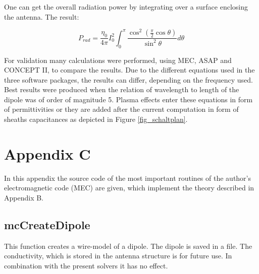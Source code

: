 \documentclass[a4paper,11pt]{thesis}
\begin{document}
One can get the overall radiation power by integrating over a surface enclosing the antenna. The result:

\begin{equation}\label{total_power_hwd}
P_{rad} = \frac{\eta_0}{4 \pi} I_0^2 \int_0^{\pi} \frac{\cos^2 (\frac{\pi}{2} \cos \theta)}{\sin^2 \theta} d \theta
\end{equation}

For validation many calculations were performed, using MEC, ASAP and CONCEPT II, to compare the results. Due to the different equations used in the three software packages, the results can differ, depending on the frequency used. Best results were produced when the relation of wavelength to length of the dipole was of order of magnitude 5. Plasma effects enter these equations in form of permittivities or they are added after the current computation in form of sheaths capacitances as depicted in Figure \ref{fig_schaltplan}.


\chapter{\textbf{Appendix C}}
In this appendix the source code of the most important routines of the author's electromagnetic code (MEC) are given, which implement the theory described in Appendix B.

\section{mcCreateDipole}
This function creates a wire-model of a dipole. The dipole is saved in a file. The conductivity, which is stored in the antenna structure is for future use. In combination with the present solvers it has no effect.
\end{document}
